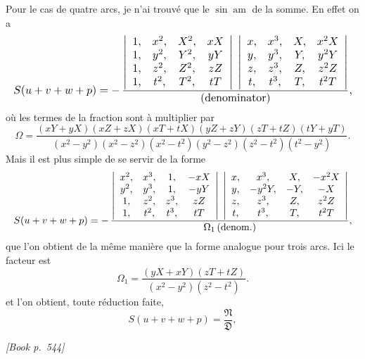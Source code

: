 \documentclass[11pt]{article}
\begin{document}
Pour le cas de quatre arcs, je n'ai trouv\'e que le $\sin\operatorname{am}$ de la somme. En effet on a
\[ \resizebox{\textwidth}{!}{$\displaystyle
S(u + v + w + p) = -\,\frac{\left|\begin{array}{cccc}1, & x^{2}, & X^{2}, & xX\\ 1, & y^{2}, & Y^{2}, & yY\\ 1, & z^{2}, & Z^{2}, & zZ\\ 1, & t^{2}, & T^{2}, & tT\end{array}\right|\;\left|\begin{array}{cccc}x, & x^{3}, & X, & x^{2}X\\ y, & y^{3}, & Y, & y^{2}Y\\ z, & z^{3}, & Z, & z^{2}Z\\ t, & t^{3}, & T, & t^{2}T\end{array}\right|}{(\text{denominator})},
$} \]
o\`u les termes de la fraction sont \`a multiplier par
\[
\Omega = \frac{(xY + yX)(xZ + zX)(xT + tX)(yZ + zY)(zT + tZ)(tY + yT)}{(x^{2} - y^{2})(x^{2} - z^{2})(x^{2} - t^{2})(y^{2} - z^{2})(z^{2} - t^{2})(t^{2} - y^{2})}.
\]
Mais il est plus simple de se servir de la forme
\[ \resizebox{\textwidth}{!}{$\displaystyle
S(u + v + w + p) = -\,\frac{\left|\begin{array}{cccc}x^{2}, & x^{3}, & 1, & -xX\\ y^{2}, & y^{3}, & 1, & -yY\\ 1, & z^{2}, & z^{3}, & zZ\\ 1, & t^{2}, & t^{3}, & tT\end{array}\right|\;\left|\begin{array}{cccc}x, & x^{3}, & X, & -x^{2}X\\ y, & -y^{2}Y, & -Y, & -X\\ z, & z^{3}, & Z, & z^{2}Z\\ t, & t^{3}, & T, & t^{2}T\end{array}\right|}{\Omega_{1}\,(\text{denom.})},
$} \]
que l'on obtient de la m\^eme mani\`ere que la forme analogue pour trois arcs. Ici le facteur est
\[
\Omega_{1} = \frac{(yX + xY)(zT + tZ)}{(x^{2} - y^{2})(z^{2} - t^{2})}.
\]
et l'on obtient, toute r\'eduction faite,
\[
S(u + v + w + p) = \frac{\mathfrak{N}}{\mathfrak{D}},
\]

\medskip
\noindent\textit{[Book p.~544]}\hfill

\smallskip
\end{document}
